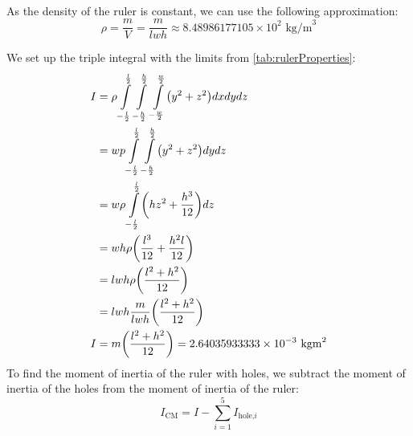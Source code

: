 \documentclass[article, 12pt]{article}
\DeclarePairedDelimiter\paren{(}{)} %
\newcommand{\tplint}[6]{\int\limits^{#1}_{#2}\int\limits^{#3}_{#4}\int\limits^{#5}_{#6}} %
\newcommand{\dblint}[4]{\int\limits^{#1}_{#2}\int\limits^{#3}_{#4}} %
\newcommand{\sglint}[2]{\int\limits^{#1}_{#2}} %
\begin{document}
\begin{enumerate}[1)]
    \\
    As the density of the ruler is constant, we can use the following approximation:
    \begin{equation}
        \rho = \frac{m}{V} = \frac{m}{lwh} \approx 8.48986177105 \times 10^2 \text{ kg/m}^3
        \label{eq:density}
    \end{equation}
    \begin{comment}
    The volume of the ruler is:
    \begin{align}
        V &= V_\text{ruler} - V_\text{holes} \nonumber\\
          &= lwh - 5\paren*{\pi \paren*{\frac{d}{2}}^2 h} \nonumber\\
          &\approx 0.00010365304215 \text{ m}^3
    \end{align}
    As the density of the ruler is constant, we can use the following approximation:
    \begin{equation}
        \rho = \frac{m}{V} \approx 848.986177105 \text{ kg/m}^3
    \end{equation}
    \end{comment}
    We set up the triple integral with the limits from \autoref{tab:rulerProperties}:
    \begin{align}
        I           &= \rho \tplint{\frac{l}{2}}{-\frac{l}{2}}{\frac{h}{2}}{-\frac{h}{2}}{\frac{w}{2}}{-\frac{w}{2}} \paren*{y^2 + z^2} dx dy dz \nonumber\\
                    &= wp \dblint{\frac{l}{2}}{-\frac{l}{2}}{\frac{h}{2}}{-\frac{h}{2}} \paren*{y^2 + z^2} dy dz \nonumber\\
                    &= w\rho \sglint{\frac{l}{2}}{-\frac{l}{2}} \paren*{hz^2 + \frac{h^3}{12}} dz \nonumber\\
                    &= wh\rho\paren*{\frac{l^3}{12} + \frac{h^2 l}{12}} \nonumber\\
                    &= lwh\rho\paren*{\frac{l^2 + h^2}{12}} \nonumber\\
                    &= lwh \frac{m}{lwh} \paren*{\frac{l^2 + h^2}{12}} \nonumber\\
        I           &= m\paren*{\frac{l^2 + h^2}{12}} = 2.64035933333 \times 10^{-3} \text{ kgm}^2
    \end{align}
    To find the moment of inertia of the ruler with holes, we subtract the moment of inertia of the holes from the moment of inertia of the ruler:
    \begin{equation}
        I_\text{CM} = I - \sum \limits_{i=1}^5 I_{\text{hole,}i}

\end{equation}
\end{enumerate}
\end{document}
